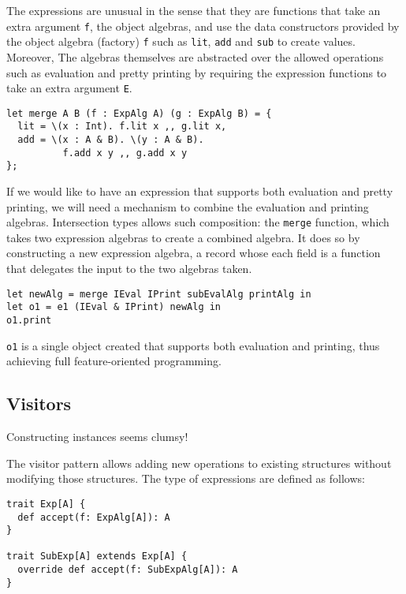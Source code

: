 The expressions are unusual in the sense that they are functions that take an
extra argument \lstinline{f}, the object algebras, and use the data constructors
provided by the object algebra (factory) \lstinline{f} such as \lstinline{lit},
\lstinline{add} and \lstinline{sub} to create values. Moreover, The algebras
themselves are abstracted over the allowed operations such as evaluation and
pretty printing by requiring the expression functions to take an extra argument
\lstinline{E}.

\begin{lstlisting}
let merge A B (f : ExpAlg A) (g : ExpAlg B) = {
  lit = \(x : Int). f.lit x ,, g.lit x,
  add = \(x : A & B). \(y : A & B).
          f.add x y ,, g.add x y
};
\end{lstlisting}

If we would like to have an expression that supports both evaluation and pretty
printing, we will need a mechanism to combine the evaluation and printing
algebras. Intersection types allows such composition: the \lstinline{merge}
function, which takes two expression algebras to create a combined algebra. It
does so by constructing a new expression algebra, a record whose each field is a
function that delegates the input to the two algebras taken.

\begin{lstlisting}
let newAlg = merge IEval IPrint subEvalAlg printAlg in
let o1 = e1 (IEval & IPrint) newAlg in
o1.print
\end{lstlisting}

\lstinline{o1} is a single object created that supports both evaluation and
printing, thus achieving full feature-oriented programming.

\subsection{Visitors}

Constructing instances seems clumsy!

The visitor pattern allows adding new operations to existing structures without
modifying those structures. The type of expressions are defined as follows:

\begin{verbatim}
trait Exp[A] {
  def accept(f: ExpAlg[A]): A
}

trait SubExp[A] extends Exp[A] {
  override def accept(f: SubExpAlg[A]): A
}
\end{verbatim}


